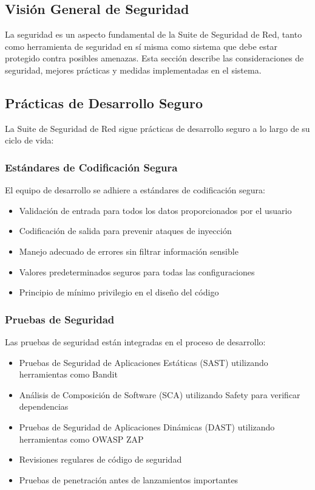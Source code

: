 \subsection{Visión General de Seguridad}
La seguridad es un aspecto fundamental de la Suite de Seguridad de Red, tanto como herramienta de seguridad en sí misma como sistema que debe estar protegido contra posibles amenazas. Esta sección describe las consideraciones de seguridad, mejores prácticas y medidas implementadas en el sistema.

\subsection{Prácticas de Desarrollo Seguro}
La Suite de Seguridad de Red sigue prácticas de desarrollo seguro a lo largo de su ciclo de vida:

\subsubsection{Estándares de Codificación Segura}
El equipo de desarrollo se adhiere a estándares de codificación segura:

\begin{itemize}
    \item Validación de entrada para todos los datos proporcionados por el usuario
    \item Codificación de salida para prevenir ataques de inyección
    \item Manejo adecuado de errores sin filtrar información sensible
    \item Valores predeterminados seguros para todas las configuraciones
    \item Principio de mínimo privilegio en el diseño del código
\end{itemize}

\subsubsection{Pruebas de Seguridad}
Las pruebas de seguridad están integradas en el proceso de desarrollo:

\begin{itemize}
    \item Pruebas de Seguridad de Aplicaciones Estáticas (SAST) utilizando herramientas como Bandit
    \item Análisis de Composición de Software (SCA) utilizando Safety para verificar dependencias
    \item Pruebas de Seguridad de Aplicaciones Dinámicas (DAST) utilizando herramientas como OWASP ZAP
    \item Revisiones regulares de código de seguridad
    \item Pruebas de penetración antes de lanzamientos importantes
\end{itemize}

